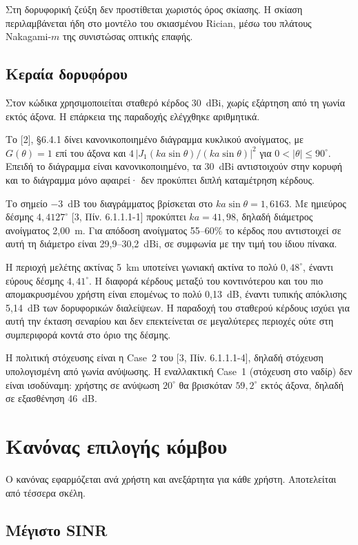 \documentclass[11pt,a4paper]{article}
\begin{document}
Στη δορυφορική ζεύξη δεν προστίθεται χωριστός όρος σκίασης. Η σκίαση
περιλαμβάνεται ήδη στο μοντέλο του σκιασμένου Rician, μέσω του πλάτους
Nakagami-$m$ της συνιστώσας οπτικής επαφής.

\subsection{Κεραία δορυφόρου}

Στον κώδικα χρησιμοποιείται σταθερό κέρδος 30~dBi, χωρίς εξάρτηση από τη γωνία
εκτός άξονα. Η επάρκεια της παραδοχής ελέγχθηκε αριθμητικά.

Το [2], §6.4.1 δίνει κανονικοποιημένο διάγραμμα κυκλικού ανοίγματος, με
$G(\theta) = 1$ επί του άξονα και $4\,|J_1(ka\sin\theta)/(ka\sin\theta)|^2$ για
$0 < |\theta| \le 90^\circ$. Επειδή το διάγραμμα είναι κανονικοποιημένο, τα
30~dBi αντιστοιχούν στην κορυφή και το διάγραμμα μόνο αφαιρεί· δεν προκύπτει
διπλή καταμέτρηση κέρδους.

Το σημείο $-3$~dB του διαγράμματος βρίσκεται στο $ka\sin\theta = 1{,}6163$.
Με ημιεύρος δέσμης $4{,}4127^\circ$ [3, Πίν. 6.1.1.1-1] προκύπτει $ka = 41{,}98$,
δηλαδή διάμετρος ανοίγματος 2,00~m. Για απόδοση ανοίγματος 55–60\% το κέρδος
που αντιστοιχεί σε αυτή τη διάμετρο είναι 29,9–30,2~dBi, σε συμφωνία με την
τιμή του ίδιου πίνακα.

Η περιοχή μελέτης ακτίνας 5~km υποτείνει γωνιακή ακτίνα το πολύ $0{,}48^\circ$,
έναντι εύρους δέσμης $4{,}41^\circ$. Η διαφορά κέρδους μεταξύ του κοντινότερου
και του πιο απομακρυσμένου χρήστη είναι επομένως το πολύ 0,13~dB, έναντι
τυπικής απόκλισης 5,14~dB των δορυφορικών διαλείψεων. Η παραδοχή του σταθερού
κέρδους ισχύει για αυτή την έκταση σεναρίου και δεν επεκτείνεται σε μεγαλύτερες
περιοχές ούτε στη συμπεριφορά κοντά στο όριο της δέσμης.

Η πολιτική στόχευσης είναι η Case~2 του [3, Πίν. 6.1.1.1-4], δηλαδή στόχευση
υπολογισμένη από γωνία ανύψωσης. Η εναλλακτική Case~1 (στόχευση στο ναδίρ) δεν
είναι ισοδύναμη: χρήστης σε ανύψωση $20^\circ$ θα βρισκόταν $59{,}2^\circ$
εκτός άξονα, δηλαδή σε εξασθένηση 46~dB.

\section{Κανόνας επιλογής κόμβου}

Ο κανόνας εφαρμόζεται ανά χρήστη και ανεξάρτητα για κάθε χρήστη. Αποτελείται από
τέσσερα σκέλη.

\subsection{Μέγιστο SINR}
\end{document}
